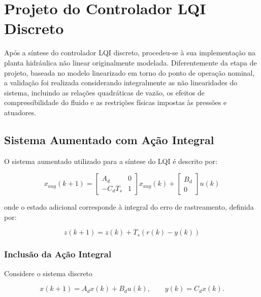 \section{Projeto do Controlador LQI Discreto}
\label{sec:controle-lqi-discreto}

Após a síntese do controlador LQI discreto, procedeu-se à sua implementação na planta hidráulica não linear originalmente modelada. Diferentemente da etapa de projeto, baseada no modelo linearizado em torno do ponto de operação nominal, a validação foi realizada considerando integralmente as não linearidades do sistema, incluindo as relações quadráticas de vazão, os efeitos de compressibilidade do fluido e as restrições físicas impostas às pressões e atuadores.

\subsection{Sistema Aumentado com Ação Integral}

O sistema aumentado utilizado para a síntese do LQI é descrito por:

\begin{equation}
x_{aug}(k+1) =
\begin{bmatrix}
A_d & 0 \\
- C_d T_s & 1
\end{bmatrix}
x_{aug}(k)
+
\begin{bmatrix}
B_d \\
0
\end{bmatrix}
u(k)
\end{equation}

onde o estado adicional corresponde à integral do erro de rastreamento, definida por:

\begin{equation}
z(k+1) = z(k) + T_s \left( r(k) - y(k) \right)
\end{equation}

\subsubsection{Inclusão da Ação Integral}

Considere o sistema discreto

\begin{equation}
x(k+1) = A_d x(k) + B_d u(k),
\qquad
y(k) = C_d x(k).
\end{equation}

